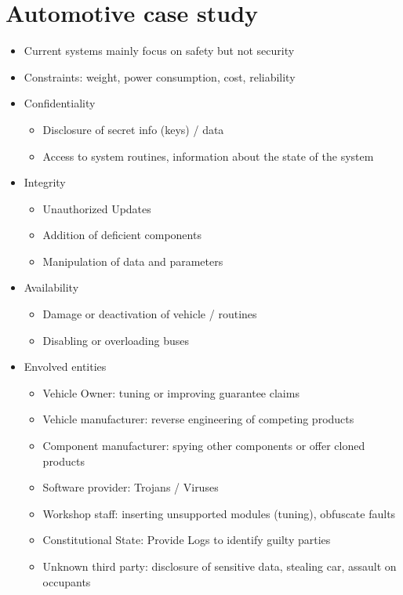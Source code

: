 \documentclass[11pt, paper=a4, twocolumn]{scrartcl}
\begin{document}
	\section{Automotive case study}
		\begin{itemize}
			\item Current systems mainly focus on safety but not security
			\item Constraints: weight, power consumption, cost, reliability
			\item Confidentiality
				\begin{itemize}
					\item Disclosure of secret info (keys) / data
					\item Access to system routines, information about the state of the system
				\end{itemize}
			\item Integrity
				\begin{itemize}
					\item Unauthorized Updates
					\item Addition of deficient components
					\item Manipulation of data and parameters
				\end{itemize}
			\item Availability
				\begin{itemize}
					\item Damage or deactivation of vehicle / routines
					\item Disabling or overloading buses
				\end{itemize}
			\item Envolved entities
				\begin{itemize}
					\item Vehicle Owner: tuning or improving guarantee claims
					\item Vehicle manufacturer: reverse engineering of competing products
					\item Component manufacturer: spying other components or offer cloned products
					\item Software provider: Trojans / Viruses
					\item Workshop staff: inserting unsupported modules (tuning), obfuscate faults
					\item Constitutional State: Provide Logs to identify guilty parties
					\item Unknown third party: disclosure of sensitive data, stealing car, assault on occupants
				\end{itemize}

\end{itemize}
\end{document}
